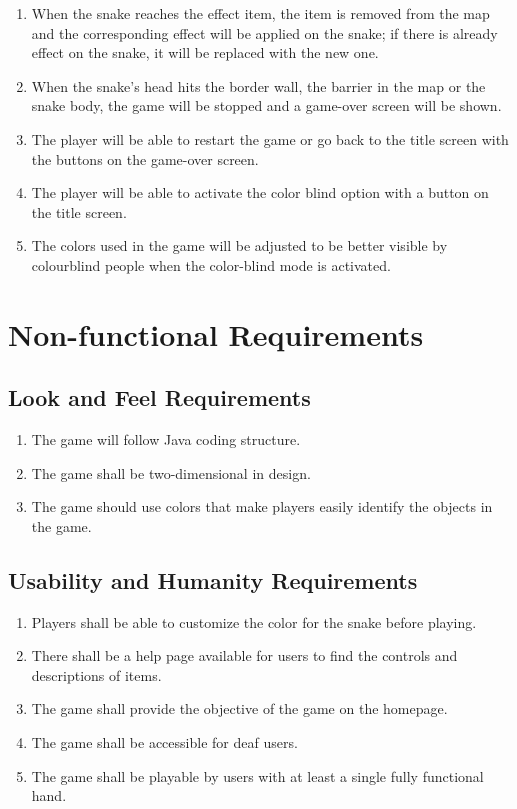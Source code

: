 \documentclass[12pt, titlepage]{article}
\begin{document}
\begin{enumerate}[{FR}1.]
    \item When the snake reaches the effect item, the item is removed from the map and the corresponding effect will be applied on the snake; if there is already effect on the snake, it will be replaced with the new one.
    \item When the snake's head hits the border wall, the barrier in the map or the snake body, the game will be stopped and a game-over screen will be shown.
    \item The player will be able to restart the game or go back to the title screen with the buttons on the game-over screen.
    \item The player will be able to activate the color blind option with a button on the title screen.
    \item The colors used in the game will be adjusted to be better visible by  colourblind people when the color-blind mode is activated.
\end{enumerate}
\section{Non-functional Requirements}

\subsection{Look and Feel Requirements}
\begin{enumerate}[{LF}1. ]
	\item The game will follow Java coding structure.
	\item The game shall be two-dimensional in design.
	\item The game should use colors that make players  easily identify the objects in the game.
\end{enumerate}
\subsection{Usability and Humanity Requirements}
\begin{enumerate}[{UH}1. ]
	\item  Players shall be able to customize the color for the snake before playing.
	\item There shall be a help page available for users to find the controls and descriptions of items.
	\item The game shall provide the objective of the game on the homepage.
	\item The game shall be accessible for deaf users.
	\item The game shall be playable by users with at least a single fully functional hand.
\end{enumerate}
\end{document}
